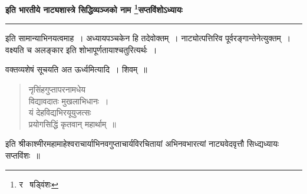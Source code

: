 \documentclass[11pt, openany]{book}
\begin{document}
\begin{center}
\textbf{इति भारतीये नाट्यशास्त्रे सिद्धिव्यञ्जको नाम \renewcommand{\thefootnote}{2}\footnote{र \textendash\  षड्विंशः}सप्तविंशोऽध्यायः}
\end{center}

\hrule

\vspace{2mm}
\noindent
इति सामान्याभिनयत्वमाह~। अध्यायपञ्चकेन हि तदेवोक्तम्~। नाट्योत्पत्तिरिव पूर्वरङ्गान्तेनेत्युक्तम्~। वक्ष्यति च अलङ्कार इति शोभापूर्णतायाश्चतुरित्यर्थः~।

\begin{center}
वक्तव्यशेषं सूचयति अत ऊर्ध्वमित्यादि~। शिवम्~॥
\end{center}

\begin{quote}
{\qt नृसिंहगुप्तापरनामधेय\textendash\  \\
विद्यावदातः मुखलाभिधानः~। \\
यं देहविद्यभिरयूयुजत्सः \\
प्रयोगसिद्धिं कृतवान् महार्थाम्~॥}
\end{quote}

\begin{center}
इति श्रीकाश्मीरमहामाहेश्वराचार्याभिनवगुप्ताचार्यविरचितायां अभिनवभारत्यां नाट्यवेदवृत्तौ सिध्द्यध्यायः सप्तविंशः~॥
\end{center}
\end{document}
